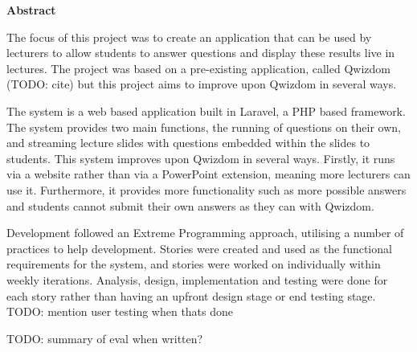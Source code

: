 \thispagestyle{empty}

\begin{center}
    {\LARGE\bf Abstract}
\end{center}

The focus of this project was to create an application that can be used by lecturers to allow students to answer questions and display these results live in lectures. The project was based on a pre-existing application, called Qwizdom (TODO: cite) but this project aims to improve upon Qwizdom in several ways.

The system is a web based application built in Laravel, a PHP based framework. The system provides two main functions, the running of questions on their own, and streaming lecture slides with questions embedded within the slides to students. This system improves upon Qwizdom in several ways. Firstly, it runs via a website rather than via a PowerPoint extension, meaning more lecturers can use it. Furthermore, it provides more functionality such as more possible answers and students cannot submit their own answers as they can with Qwizdom.

Development followed an Extreme Programming approach, utilising a number of practices to help development. Stories were created and used as the functional requirements for the system, and stories were worked on individually within weekly iterations. Analysis, design, implementation and testing were done for each story rather than having an upfront design stage or end testing stage.
TODO: mention user testing when thats done

TODO: summary of eval when written?